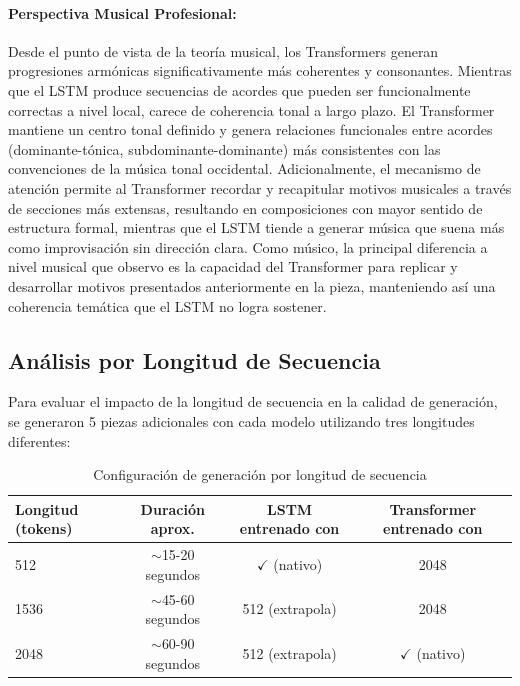 \documentclass[12pt,a4paper]{article}
\begin{document}
\paragraph{Perspectiva Musical Profesional:}
Desde el punto de vista de la teoría musical, los Transformers generan progresiones armónicas significativamente más coherentes y consonantes. Mientras que el LSTM produce secuencias de acordes que pueden ser funcionalmente correctas a nivel local, carece de coherencia tonal a largo plazo. El Transformer mantiene un centro tonal definido y genera relaciones funcionales entre acordes (dominante-tónica, subdominante-dominante) más consistentes con las convenciones de la música tonal occidental. Adicionalmente, el mecanismo de atención permite al Transformer recordar y recapitular motivos musicales a través de secciones más extensas, resultando en composiciones con mayor sentido de estructura formal, mientras que el LSTM tiende a generar música que suena más como improvisación sin dirección clara. Como músico, la principal diferencia a nivel musical que observo es la capacidad del Transformer para replicar y desarrollar motivos presentados anteriormente en la pieza, manteniendo así una coherencia temática que el LSTM no logra sostener.

\subsection{Análisis por Longitud de Secuencia}

Para evaluar el impacto de la longitud de secuencia en la calidad de generación, se generaron 5 piezas adicionales con cada modelo utilizando tres longitudes diferentes:

\begin{table}[H]
\centering
\begin{tabular}{lccc}
\toprule
\textbf{Longitud (tokens)} & \textbf{Duración aprox.} & \textbf{LSTM entrenado con} & \textbf{Transformer entrenado con} \\
\midrule
512 & $\sim$15-20 segundos & $\checkmark$ (nativo) & 2048 \\
1536 & $\sim$45-60 segundos & 512 (extrapola) & 2048 \\
2048 & $\sim$60-90 segundos & 512 (extrapola) & $\checkmark$ (nativo) \\
\bottomrule
\end{tabular}
\caption{Configuración de generación por longitud de secuencia}
\end{table}
\end{document}
